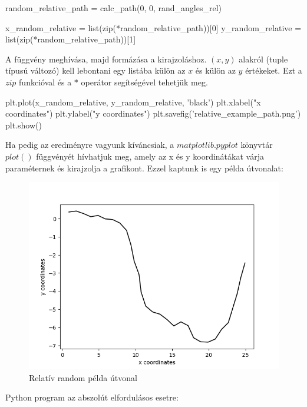\begin{python}
random_relative_path = calc_path(0, 0, rand_angles_rel)

x_random_relative = list(zip(*random_relative_path))[0]
y_random_relative = list(zip(*random_relative_path))[1]
\end{python}
A függvény meghívása, majd formázása a kirajzoláshoz. $ (x, y) $ alakról (tuple típusú változó) kell lebontani egy listába külön az $ x $ és külön az $ y $ értékeket. Ezt a $ zip $ funkcióval és a $ * $ operátor segítségével tehetjük meg.\\

\begin{python}
plt.plot(x_random_relative, y_random_relative, 'black')
plt.xlabel("x coordinates")
plt.ylabel("y coordinates")
plt.savefig('relative_example_path.png')
plt.show()
\end{python}
Ha pedig az eredményre vagyunk kíváncsiak, a $ matplotlib.pyplot $ könyvtár  $ plot() $ függvényét hívhatjuk meg, amely az x és y koordinátákat várja paraméternek és kirajzolja a grafikont. Ezzel kaptunk is egy példa útvonalat:

\begin{figure}[h!]
\centering
\includegraphics[scale=0.75]{images/relative_example_path.png}
\caption{Relatív random példa útvonal}
\label{fig:relative_path}
\end{figure}

Python program az abszolút elfordulásos esetre:

